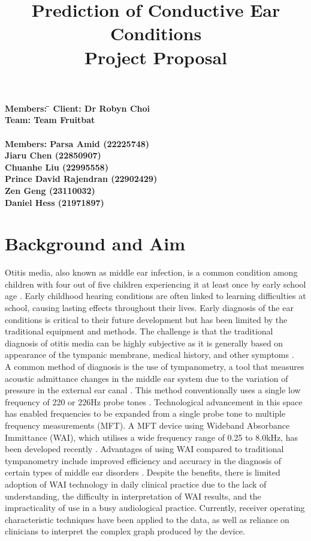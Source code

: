 \documentclass[11pt,a4paper]{article}
\title{Prediction of Conductive Ear Conditions\\
\large Project Proposal}
\date{}
\begin{document}
\maketitle

\begin{tabbing}
\bf Members: \=\kill
\bf Client: \> Dr Robyn Choi\\

\bf Team: \> Team Fruitbat\\
\> \\
\bf Members: \> Parsa Amid (22225748)\\
\> Jiaru Chen (22850907)\\
\> Chuanhe Liu (22995558)\\
\> Prince David Rajendran (22902429)\\
\> Zen Geng (23110032) \\
\> Daniel Hess (21971897) \\
\end{tabbing}

\section*{Background and Aim}
Otitis media, also known as middle ear infection, is a common condition among children with four out of five children experiencing it at least once by early school age \cite{rch}. Early childhood hearing conditions are often linked to learning difficulties at school, causing lasting effects throughout their lives. Early diagnosis of the ear conditions is critical to their future development but has been limited by the traditional equipment and methods. The challenge is that the traditional diagnosis of otitis media can be highly subjective as it is generally based on appearance of the tympanic membrane, medical history, and other symptoms \cite{mja}.\\

A common method of diagnosis is the use of tympanometry, a tool that measures acoustic admittance changes in the middle ear system due to the variation of pressure in the external ear canal \cite{margolis}. This method conventionally uses a single low frequency of 220 or 226Hz probe tones \cite{grais}. Technological advancement in this space has enabled frequencies to be expanded from a single probe tone to multiple frequency measurements (MFT). A MFT device using Wideband Absorbance Immittance (WAI), which utilises a wide frequency range of 0.25 to 8.0kHz, has been developed recently \cite{grais}. Advantages of using WAI compared to traditional tympanometry include improved efficiency and accuracy in the diagnosis of certain types of middle ear disorders \cite{grais}. Despite the benefits, there is limited adoption of WAI technology in daily clinical practice due to the lack of understanding, the difficulty in interpretation of WAI results, and the impracticality of use in a busy audiological practice. Currently, receiver operating characteristic techniques have been applied to the data, as well as reliance on clinicians to interpret the complex graph produced by the device. \\
\end{document}
